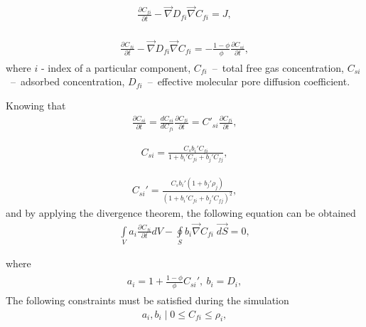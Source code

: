 \documentclass[a4paper,14pt,english]{extreport}
\begin{document}
\begin{eqnarray}
\begin{gathered}
\label{eq:langm_only_free_diffusivity_differential}
\frac{\partial C_{fi}}{\partial t} - \vec{\nabla} D_{fi} \vec{\nabla}C_{fi} = J,
\end{gathered}
\end{eqnarray}

\begin{eqnarray}
\begin{gathered}
\label{eq:langm_only_adsorbed_diffusivity_differential}
\frac{\partial C_{fi}}{\partial t} - \vec{\nabla} D_{fi} \vec{\nabla}C_{fi} = - \frac{\mathit{1} - \phi}{\phi} \frac{\partial C_{si}}{\partial t},
\end{gathered}
\end{eqnarray}
where $i$ - index of  a particular component, $C_{fi}$~--~total free gas concentration, $C_{si}$~--~adsorbed concentration, $D_{fi}$~--~effective molecular pore diffusion coefficient.

Knowing that
\begin{eqnarray}
\label{eq:langm_only_chain_rule_timeder}
\frac{\partial C_{si}}{\partial t} =  \frac{dC_{si}}{dC_{fi}}\frac{\partial C_{fi}}{\partial t} = C'_{si}\frac{\partial C_{fi}}{\partial t},
\end{eqnarray}

\begin{eqnarray}
\label{eq:langm_only_adsorbed_conc}
C_{si} =  \frac{C_{s} b_{i}' C_{fi}}{\mathit{1}+b_{i}'C_{fi}+b_{j}'C_{fj}},
\end{eqnarray}

\begin{eqnarray}
\label{eq:langm_only_adsorbed_conc_deriv}
C_{si}' =  \frac{C_{s}b_{i}' \left(\mathit{1}+b_{j}'\rho_{j}\right)}{\left(\mathit{1}+b_{i}'C_{fi}+b_{j}'C_{fj}\right)^\mathit{2}},
\end{eqnarray}
and by applying the divergence theorem, the following equation can be obtained
\begin{eqnarray}
\label{eq:langm_only_diffusivity_simplified_integral}
\int \limits_{V} a_{i} \frac{\partial C_{fi}}{\partial t} dV - \oint \limits_{S} b_{i} \vec{\nabla}C_{fi} \; \vec{dS} = \mathit{0},
\end{eqnarray}

where
\begin{eqnarray}
\begin{gathered}
\label{eq:langm_only_diffusivity_a_b_coeffs}
a_{i}  =  \mathit{1}+\frac{\mathit{1} - \phi}{\phi}C_{si}', \: b_{i}  = D_{i},
\end{gathered}
\end{eqnarray}
The following constraints must be satisfied during the simulation
\begin{eqnarray}
\label{eq:langm_only_concentration_constaints}
a_{i}, b_{i} \mid \mathit{0} \leq C_{fi} \leq \rho_i,
\end{eqnarray}
\end{document}
